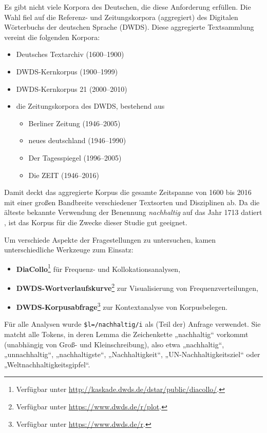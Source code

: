 \documentclass[
    german,
    a4paper,%
    12pt,%
    oneside,%
    toc=bibliography,
    final,
]{scrartcl}
\begin{document}
Es gibt nicht viele Korpora des Deutschen, die diese Anforderung erfüllen. Die Wahl fiel auf die Referenz- und Zeitungskorpora (aggregiert) des Digitalen Wörterbuchs der deutschen Sprache (DWDS). Diese aggregierte Textsammlung vereint die folgenden Korpora:

\begin{itemize}
\item Deutsches Textarchiv (1600–1900) \citep[vgl.][]{Geyken2011}
\item DWDS-Kernkorpus (1900–1999) \citep[vgl.][]{Geyken2007}
\item DWDS-Kernkorpus 21 (2000–2010) \citep[vgl.][]{Geyken2007}
\item die Zeitungskorpora des DWDS, bestehend aus
	\begin{itemize}
	\item Berliner Zeitung (1946–2005)
	\item neues deutschland (1946–1990)
	\item Der Tagesspiegel (1996–2005)
	\item Die ZEIT (1946–2016)
	\end{itemize}
\end{itemize}

Damit deckt das aggregierte Korpus die gesamte Zeitspanne von 1600 bis 2016 mit einer großen Bandbreite verschiedener Textsorten und Disziplinen ab. Da die älteste bekannte Verwendung der Benennung \textit{nachhaltig} auf das Jahr 1713 datiert \citep[vgl.][99]{Zürcher1965}, ist das Korpus für die Zwecke dieser Studie gut geeignet.

Um verschiede Aspekte der Fragestellungen zu untersuchen, kamen unterschiedliche Werkzeuge zum Einsatz:

\begin{itemize}
\item \textbf{DiaCollo}\footnote{Verfügbar unter \url{http://kaskade.dwds.de/dstar/public/diacollo/}.} \citep{Jurish2015} für Frequenz- und Kollokationsanalysen,
\item \textbf{DWDS-Wortverlaufskurve}\footnote{Verfügbar unter \url{https://www.dwds.de/r/plot}.} zur Visualisierung von Frequenzverteilungen,
\item \textbf{DWDS-Korpusabfrage}\footnote{Verfügbar unter \url{https://www.dwds.de/r}.} zur Kontextanalyse von Korpusbelegen.
\end{itemize}

Für alle Analysen wurde \lstinline|$l=/nachhaltig/i| als (Teil der) Anfrage verwendet. Sie matcht alle Tokens, in deren Lemma die Zeichenkette „nachhaltig“ vorkommt (unabhängig von Groß- und Kleinschreibung), also etwa „nachhaltig“, „unnachhaltig“, „nachhaltigste“, „Nachhaltigkeit“, „UN-Nachhaltigkeitsziel“ oder „Weltnachhaltigkeitsgipfel“.
\end{document}
